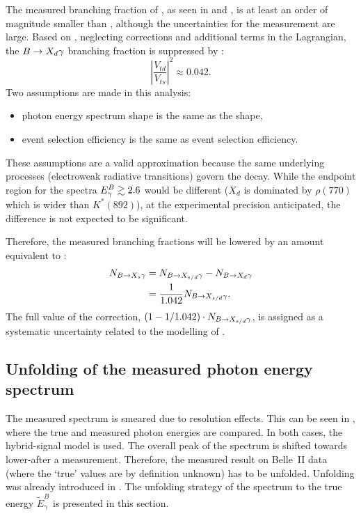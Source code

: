 The measured branching fraction of \BtoXdgamma, 
as seen in  and , is at least an order of magnitude smaller than \BtoXsgamma,
although the uncertainties for the measurement are large.
Based on , neglecting corrections and additional terms in the Lagrangian, the $\BtoXdgamma$ branching fraction
is suppressed by \cite{Workman:2022ynf}:
\begin{equation}\label{eq:btodgamma_suppression}
    \left|\frac{V_{td}}{V_{ts}}\right|^2 \approx 0.042.
\end{equation}
Two assumptions are made in this analysis:
\begin{itemize}
    \item \BtoXdgamma photon energy spectrum shape is the same as the \BtoXsgamma shape,
    \item \BtoXdgamma event selection efficiency is the same as \BtoXsgamma event selection efficiency.
\end{itemize}
These assumptions are a valid approximation because the same underlying processes (electroweak radiative transitions) govern the decay.
While the endpoint region for the spectra ${E^B_{\gamma}}\gtrsim2.6$ would be different  ($X_d$ is dominated by $\rho(770)$ 
which is wider than $K^*(892)$), at the experimental precision anticipated, the difference is not expected to be significant.

Therefore, the measured \BtoXsdgamma branching fractions will be lowered by an amount equivalent to :
\begin{align}\label{eq:btodgamma_subtraction}
    \begin{split}
    N_{\BtoXsgamma} &= N_{\BtoXsdgamma} - N_{\BtoXdgamma}\\
                    &=\frac{1}{1.042} N_{\BtoXsdgamma}.
    \end{split}
\end{align}
The full value of the correction, $(1-1/1.042) \cdot N_{\BtoXsdgamma}$, is assigned as a systematic uncertainty related to the modelling of \BtoXdgamma.

\subsection{Unfolding of the measured photon energy spectrum} \label{sec:signal_unfolding}

The measured \EB spectrum is smeared due to resolution effects.
This can be seen in , where the true and measured photon energies are compared.
In both cases, the hybrid-signal model is used.
The overall peak of the spectrum is shifted towards lower-\EB after a measurement.
Therefore, the measured result on Belle~II data (where the `true' values are by definition unknown) has to be unfolded.
Unfolding was already introduced in .
The unfolding strategy of the \EB spectrum to the true energy $\tilde{E}_{\gamma}^B$ is presented in this section.

